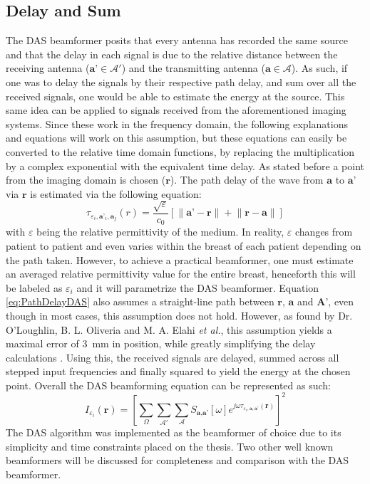 \subsection{Delay and Sum}
The DAS beamformer posits that every antenna has recorded the same source and that the delay in each signal is due to
the relative distance between the receiving antenna ($\textbf{a'} \in \mathcal{A}'$) and the transmitting antenna
($\textbf{a} \in \mathcal{A}$). As such, if one was to delay the signals by their respective path delay, and sum over
all the received signals, one would be able to estimate the energy at the source. This same idea can be applied to
signals received from the aforementioned imaging systems. Since these work in the frequency domain, the following
explanations and equations will work on this assumption, but these equations can easily be converted to the relative
time domain functions, by replacing the multiplication by a complex exponential with the equivalent time delay. As
stated before a point from the imaging domain is chosen ($\textbf{r}$). The path delay of the wave from $\textbf{a}$ to
$\textbf{a'}$ via $\textbf{r}$ is estimated via the following equation:
\begingroup
\large
\begin{equation}
    \tau_{\varepsilon_i,\textbf{a'}_i, \textbf{a}_j}(r) = \frac{\sqrt{\varepsilon}}{c_0} \left [\lVert \textbf{a'} - \textbf{r} \rVert + \lVert \textbf{r} - \textbf{a}\rVert\right ]
    \label{eq:PathDelayDAS}
\end{equation}
\endgroup
with $\varepsilon$ being the relative permittivity of the medium. In reality, $\varepsilon$ changes from patient to patient
and even varies within the breast of each patient depending on the path taken. However, to achieve a practical
beamformer, one must estimate an averaged relative permittivity value for the entire breast, henceforth this will be
labeled as $\varepsilon_i$ and it will parametrize the DAS beamformer. Equation \ref{eq:PathDelayDAS} also assumes a
straight-line path between $\textbf{r}$, $\textbf{a}$ and $\textbf{A'}$, even though in most cases, this assumption does not
hold. However, as found by Dr. O'Loughlin, B. L. Oliveria and M. A. Elahi \textit{et al.}, this assumption yields a maximal error
of $3$~mm in position, while greatly simplifying the delay calculations \cite{oloughlinParameterSearchAlgorithms2017}.
Using this, the received signals are delayed, summed across all stepped input frequencies and finally squared to yield
the energy at the chosen point. Overall the DAS beamforming equation can be represented as such:
\begingroup
\large
\begin{equation}
    I_{\varepsilon_i}(\textbf{r}) = \left [\sum_{\Omega}\sum_{\mathcal{A}'}\sum_{\mathcal{A}} S_{\textbf{a}, \textbf{a'}}[\omega]e^{j\omega \tau_{\varepsilon_i, \textbf{a}, \textbf{a'}}(\textbf{r})}\right ]^2
    \label{eq:DASBeamformer}
\end{equation}
\endgroup
The DAS algorithm was implemented as the beamformer of choice due to its simplicity and time constraints placed on the
thesis. Two other well known beamformers will be discussed for completeness and comparison with the DAS beamformer. 


